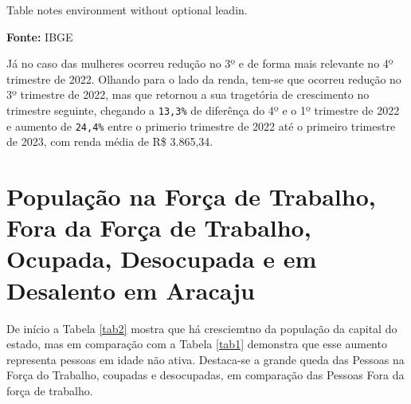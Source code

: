 \begin{tablenotes}
Table notes environment without optional leadin.
\end{tablenotes}

\textbf{Fonte:} IBGE \citep{ibge2023}

Já no caso das mulheres ocorreu redução no 3º e de forma mais relevante
no 4º trimestre de 2022. Olhando para o lado da renda, tem-se que
ocorreu redução no 3º trimestre de 2022, mas que retornou a sua
tragetória de crescimento no trimestre seguinte, chegando a
\texttt{13,3\%} de diferênça do 4º e o 1º trimestre de 2022 e aumento de
\texttt{24,4\%} entre o primerio trimestre de 2022 até o primeiro
trimestre de 2023, com renda média de R\$ 3.865,34.

\hypertarget{populauxe7uxe3o-na-foruxe7a-de-trabalho-fora-da-foruxe7a-de-trabalho-ocupada-desocupada-e-em-desalento-em-aracaju}{%
\section{População na Força de Trabalho, Fora da Força de Trabalho,
Ocupada, Desocupada e em Desalento em
Aracaju}\label{populauxe7uxe3o-na-foruxe7a-de-trabalho-fora-da-foruxe7a-de-trabalho-ocupada-desocupada-e-em-desalento-em-aracaju}}

De início a Tabela \ref{tab2} mostra que há cresciemtno da população da
capital do estado, mas em comparação com a Tabela \ref{tab1} demonstra
que esse aumento representa pessoas em idade não ativa. Destaca-se a
grande queda das Pessoas na Força do Trabalho, coupadas e desocupadas,
em comparação das Pessoas Fora da força de trabalho.

